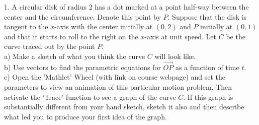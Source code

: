 \documentclass{article}
\begin{document}
1. A circular disk of radius 2 has a dot marked at a point half-way between the 
center and the circumference. Denote this point by $P$. Suppose that the disk is 
tangent to the $x$-axis with the center initially at $(0, 2)$ and $P$ initially 
at $(0, 1)$ and that it starts to roll to the right on the $x$-axis at unit 
speed. Let $C$ be the curve traced out by the point $P$. \\
a) Make a sketch of what you think the curve $C$ will look like. \\
b) Use vectors to find the parametric equations for $\vec{OP}$ as a function of 
time $t$. \\
c) Open the 'Mathlet' Wheel (with link on course webpage) and set the parameters 
to view an animation of this particular motion problem. Then activate the 
'Trace' function to see a graph of the curve $C$. If this graph is substantially 
different from your hand sketch, sketch it also and then describe what led you 
to produce your first idea of the graph.
\end{document}
